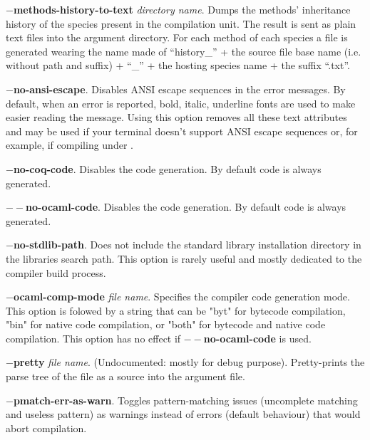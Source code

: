 \begin{compact-itemize}
 \item[*] {\bf $-$methods-history-to-text} {\em directory
   name}. Dumps the methods' inheritance history of the species
   present in the compilation unit. The result is sent as plain text files
   into the argument directory. For each method of each species a file
   is generated wearing the name made of ``history\_'' + the source
   file base name (i.e. without path and suffix) + ``\_'' + the
   hosting species name + the suffix ``.txt''.

  \item[*] {\bf $-$no-ansi-escape}. Disables ANSI escape sequences in
    the error messages. By default, when an error is reported, bold,
    italic, underline fonts are used to make easier reading the
    message. Using this option removes all these text attributes and
    may be used if your terminal doesn't support ANSI escape sequences
    or, for example, if compiling under \emacs.

  \item[*] {\bf $-$no-coq-code}. Disables the {\coq} code
    generation. By default {\coq} code is always generated.

  \item[*] {\bf $--$no-ocaml-code}. Disables the {\ocaml} code
    generation. By default {\ocaml} code is always generated.

   \item[*] {\bf $-$no-stdlib-path}. Does not include the standard
    library installation directory in the libraries search path. This
    option is rarely useful and mostly dedicated to the
    {\focal} compiler build process.

   \item[*] {\bf $-$ocaml-comp-mode} {\em file name}. Specifies the
     {\ocaml} compiler code generation mode. This option is folowed by
     a string that can be "byt" for bytecode compilation, "bin" for
     native code compilation, or "both" for bytecode and native code
     compilation. This option has no effect if {\bf $--$no-ocaml-code}
     is used.

  \item[*] {\bf $-$pretty} {\em file name}. (Undocumented: mostly for
    debug purpose). Pretty-prints the parse tree of the {\focal} file
    as a {\focal} source into the argument file.

  \item[*] {\bf $-$pmatch-err-as-warn}. Toggles pattern-matching issues
    (uncomplete matching and useless pattern) as warnings instead of
    errors (default behaviour) that would abort compilation.


\end{compact-itemize}
